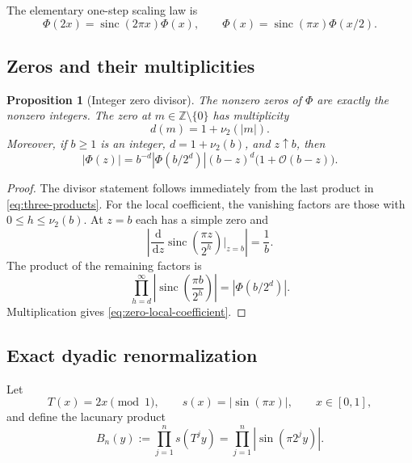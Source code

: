 \documentclass[11pt,oneside]{article}
\newtheorem{proposition}[theorem]{Proposition}
\theoremstyle{definition}
\theoremstyle{remark}
\newcommand{\Z}{\mathbb Z}
\newcommand{\dd}{\,\mathrm d}
\newcommand{\sinc}{\operatorname{sinc}}
\newcommand{\Phiup}{\Phi}
\newcommand{\bigO}{\mathcal O}
\newcommand{\vtwo}{\nu_2}
\newcommand{\abs}[1]{\left|#1\right|}
\begin{document}
The elementary one-step scaling law is
\begin{equation}
 \Phiup(2x)=\sinc(2\pi x)\Phiup(x),
 \qquad
 \Phiup(x)=\sinc(\pi x)\Phiup(x/2).
 \label{eq:one-step-scaling}
\end{equation}

\subsection{Zeros and their multiplicities}

\begin{proposition}[Integer zero divisor]
\label{prop:zero-divisor}
The nonzero zeros of $\Phiup$ are exactly the nonzero integers.  The zero at
$m\in\Z\setminus\{0\}$ has multiplicity
\[
 d(m)=1+\vtwo(\abs m).
\]
Moreover, if $b\ge1$ is an integer, $d=1+\vtwo(b)$, and $z\uparrow b$, then
\begin{equation}
 \abs{\Phiup(z)}
 =b^{-d}\abs{\Phiup(b/2^d)}(b-z)^d\bigl(1+\bigO(b-z)\bigr).
 \label{eq:zero-local-coefficient}
\end{equation}
\end{proposition}

\begin{proof}
The divisor statement follows immediately from the last product in
\eqref{eq:three-products}.  For the local coefficient, the vanishing factors are those with
$0\le h\le\vtwo(b)$.  At $z=b$ each has a simple zero and
\[
 \abs{\frac{\dd}{\dd z}\sinc\!\left(\frac{\pi z}{2^h}\right)\Big|_{z=b}}
 =\frac1b.
\]
The product of the remaining factors is
\[
 \prod_{h=d}^{\infty}
 \abs{\sinc\!\left(\frac{\pi b}{2^h}\right)}
 =\abs{\Phiup(b/2^d)}.
\]
Multiplication gives \eqref{eq:zero-local-coefficient}.
\end{proof}

\subsection{Exact dyadic renormalization}
\label{subsec:dyadic-renormalization}

Let
\[
 T(x)=2x\pmod1,
 \qquad
 s(x)=\abs{\sin(\pi x)},
 \qquad x\in[0,1],
\]
and define the lacunary product
\begin{equation}
 B_n(y):=\prod_{j=1}^{n}s(T^j y)
 =\prod_{j=1}^{n}\abs{\sin(\pi2^j y)}.
 \label{eq:Bny}
\end{equation}
\end{document}
